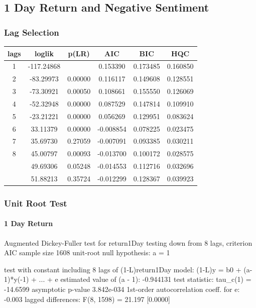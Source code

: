 \subsection{1 Day Return and Negative Sentiment}

\subsubsection{Lag Selection}

\begin{center}
\begin{tabular}{ c c c c c c }
lags & loglik & p(LR) & AIC & BIC & HQC \\
\hline
1 & -117.24868 & & 0.153390 & 0.173485 & 0.160850 \\
2 & -83.29973 & 0.00000 & 0.116117 & 0.149608 & 0.128551 \\
3 & -73.30921 & 0.00050 & 0.108661 & 0.155550 & 0.126069 \\
4 & -52.32948 & 0.00000 & 0.087529 & 0.147814 & 0.109910 \\
5 & -23.21221 & 0.00000 & 0.056269 & 0.129951 & 0.083624 \\
6 & 33.11379 & 0.00000 & -0.008854 & 0.078225 & 0.023475 \\
7 & 35.69730 & 0.27059 & -0.007091 & 0.093385 & 0.030211 \\
8 & 45.00797 & 0.00093 & -0.013700 & 0.100172 & 0.028575 \\
\arrayrulecolor{red}\hline
9 & 49.69306 & 0.05248 & -0.014553 & 0.112716 & 0.032696 \\
\arrayrulecolor{red}\hline
10 & 51.88213 & 0.35724 & -0.012299 & 0.128367 & 0.039923 \\
\end{tabular}
\end{center}

\subsubsection{Unit Root Test}

\paragraph{1 Day Return}

Augmented Dickey-Fuller test for return1Day
testing down from 8 lags, criterion AIC
sample size 1608
unit-root null hypothesis: a = 1

test with constant
including 8 lags of (1-L)return1Day
model: (1-L)y = b0 + (a-1)*y(-1) + ... + e
estimated value of (a - 1): -0.944131
test statistic: tau\_c(1) = -14.6599
asymptotic p-value 3.842e-034
1st-order autocorrelation coeff. for e: -0.003
lagged differences: F(8, 1598) = 21.197 [0.0000]

